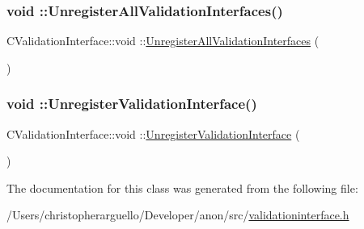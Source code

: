\subsubsection{\texorpdfstring{void \+::\+Unregister\+All\+Validation\+Interfaces()}{void ::UnregisterAllValidationInterfaces()}}
{\footnotesize\ttfamily C\+Validation\+Interface\+::void \+::\mbox{\hyperlink{validationinterface_8h_a8fe3fbf8c47cc0419fd7b9a14e8b140d}{Unregister\+All\+Validation\+Interfaces}} (\begin{DoxyParamCaption}{ }\end{DoxyParamCaption})\hspace{0.3cm}{\ttfamily [protected]}}

\mbox{\label{class_c_validation_interface_aaed3b260b3de64ed423a9a24bf0e29f4}} 
\subsubsection{\texorpdfstring{void \+::\+Unregister\+Validation\+Interface()}{void ::UnregisterValidationInterface()}}
{\footnotesize\ttfamily C\+Validation\+Interface\+::void \+::\mbox{\hyperlink{validationinterface_8h_a5e1776de1f87b4d045e9e2a198236b63}{Unregister\+Validation\+Interface}} (\begin{DoxyParamCaption}\item[{\mbox{\hyperlink{class_c_validation_interface}{C\+Validation\+Interface}} $\ast$}]{ }\end{DoxyParamCaption})\hspace{0.3cm}{\ttfamily [protected]}}



The documentation for this class was generated from the following file\+:\begin{DoxyCompactItemize}
\item 
/\+Users/christopherarguello/\+Developer/anon/src/\mbox{\hyperlink{validationinterface_8h}{validationinterface.\+h}}\end{DoxyCompactItemize}
